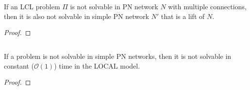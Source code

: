 

%
\begin{theorem} \label{thm:lcl_nonsolvability:4}
    If an LCL problem $\Pi$ is not solvable in PN network $N$ with multiple connections, then it is also not solvable in simple PN network $N'$ that is a lift of $N$.
\end{theorem}
\begin{proof}
\end{proof}

\subsection{} \label{sec:algorithm:theorems:b}


\begin{theorem} \label{thm:lcl_nonsolvability:5}
    If a problem is not solvable in simple PN networks, then it is not solvable in constant ($\mathcal{O}(1)$) time in the LOCAL model.
\end{theorem}
\begin{proof}
\end{proof}